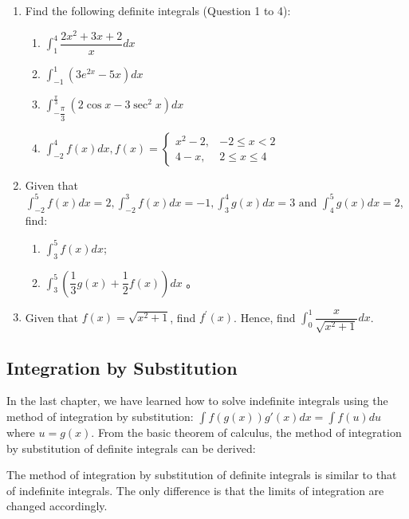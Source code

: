 \documentclass{report}
\begin{document}
\begin{enumerate}
    \item Find the following definite integrals (Question 1 to 4):
          \begin{enumerate}
              \item $\displaystyle\int_1^4 \dfrac{2 x^2+3 x+2}{x} d x$
              \item $\displaystyle\int_{-1}^1\left(3 e^{2 x}-5 x\right) d x$
              \item $\displaystyle\int_{-\dfrac{\pi}{3}}^{\frac{\pi}{3}}\left(2 \cos x-3 \sec ^2 x\right) d x$
              \item $\displaystyle\int_{-2}^4 f(x) d x, f(x)=\left\{\begin{array}{cc}x^2-2, & -2 \leq x<2 \\ 4-x, & 2 \leq x \leq 4\end{array}\right.$
          \end{enumerate}
    \item Given that $\displaystyle\int_{-2}^5 f(x) d x=2, \displaystyle\int_{-2}^3 f(x)
              d x=-1, \displaystyle\int_3^4 g(x) d x=3 \text { and } \displaystyle\int_4^5
              g(x) d x=2$, find:
          \begin{enumerate}
              \item $\displaystyle\int_3^5 f(x) d x$;
              \item $\displaystyle\int_3^5\left(\dfrac{1}{3} g(x)+\dfrac{1}{2} f(x)\right) d x$ 。
          \end{enumerate}
    \item Given that $f(x)=\sqrt{x^2+1}$, find $f^{\prime}(x)$. Hence, find
          $\displaystyle\int_0^1 \dfrac{x}{\sqrt{x^2+1}} d x$.
\end{enumerate}

\subsection*{Integration by Substitution}

In the last chapter, we have learned how to solve indefinite integrals using
the method of integration by substitution: $\displaystyle\int f(g(x))g'(x)dx =
    \int f(u)du$ where $u = g(x)$. From the basic theorem of calculus, the method
of integration by substitution of definite integrals can be derived:
\begin{center}
\end{center}
\vspace{0.9em}
The method of integration by substitution of definite integrals is similar to
that of indefinite integrals. The only difference is that the limits of
integration are changed accordingly.
\end{document}
